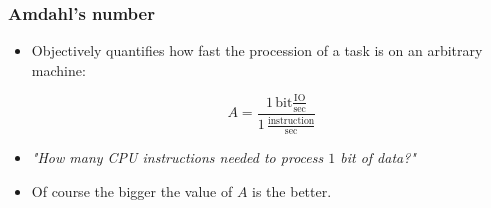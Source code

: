 \begin{frame}
\frametitle{Amdahl's number}

\begin{itemize}
	\item<1-> Objectively quantifies how fast the procession of a task is on an arbitrary machine:
	\begin{block}{}
		\begin{equation}
			A
			=
			\frac{1\,\text{bit}\frac{\text{IO}}{\text{sec}}}{1\,\frac{\text{instruction}}{\text{sec}}}
		\end{equation}
	\end{block}	
	\item<1-> \textit{"How many CPU instructions needed to process $1$ bit of data?"}
	\item<2-> Of course the bigger the value of $A$ is the better.
\end{itemize}
\end{frame}
